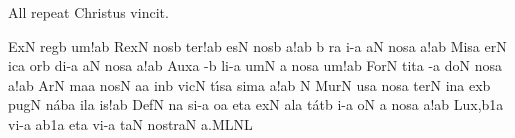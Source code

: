\bigskip

{\itlyrics All repeat \rm Christus vincit.}

\bigskip



\initiumgregorianum
{}%
\sgn {}Ex\punctum N\egn
\spatium
\sgn r{e}g\punctum b\egn
\sgn {}u{m!}\punctum a\augmentum b\egn
\spatium
\divisiofinalis
\spatium
\sgn Rex\punctum N\egn
\spatium
\sgn n{o}s\punctum b\egn
\sgn te{r!}\punctum a\augmentum b\egn
\spatium
\divisiofinalis
\spatium
{}es\punctum N\egn
\spatium
\sgn n{o}s\punctum b\egn
{}a!\punctum a\augmentum b\egn
\spatium
\divisiofinalis
\spatium
\custos b
\lineaproxima
{}r\punctum a\egn
\sgn {}i-\punctum a\egn
\sgn {}a{}\punctum N\egn
\spatium
\sgn n{o}s\punctum a\egn
{}a!\punctum a\augmentum b\egn
\spatium
\divisiofinalis
\spatium
\sgn Mis\punctum a\egn
\sgn {}er\punctum N\egn
\sgn {}ic\punctum a\egn
\sgn {}or\punctum b\egn
\sgn di-\punctum a\egn
\sgn {}a{}\punctum N\egn
\spatium
\sgn n{o}s\punctum a\egn
{}a!\punctum a\augmentum b\egn
\spatium
\divisiofinalis
\spatium
\sgn Aux\punctum a\egn
\sgn {}{\'\i}-\punctum b\egn
\sgn li-\punctum a\egn
\sgn {}um\punctum N\egn
\spatium
\custos a
\lineaproxima
\sgn n{o}s\punctum a\egn
{}u{m!}\punctum a\augmentum b\egn
\spatium
\divisiofinalis
\spatium
\sgn For\punctum N\egn
\sgn tit\punctum a\egn
{}-\punctum a\egn
\sgn do{}\punctum N\egn
\spatium
\sgn n{o}s\punctum a\egn
{}a{!}\punctum a\augmentum b\egn
\spatium
\divisiofinalis
\spatium
\sgn {}Ar\punctum N\egn
\sgn ma{}\punctum a\egn
\spatium
\sgn n{o}s\punctum N\egn
{}a{}\punctum a\egn
\spatium
\sgn {}in\punctum b\egn
\sgn vic\punctum N\egn
\sgn t{\'\i}s\punctum a\egn
\sgn sim\punctum a\egn
\sgn {}a!\punctum a\augmentum b\egn
\spatium
\divisiofinalis
\spatium
\custos N
\lineaproxima
\sgn M{u}r\punctum N\egn
\sgn {}us\punctum a\egn
\spatium
\sgn n{o}s\punctum a\egn
\sgn ter\punctum N\egn
\spatium
\sgn {}in\punctum a\egn
\sgn {}ex\punctum b\egn
\sgn pug\punctum N\egn
\sgn n{\'a}b\punctum a\egn
\sgn {}il\punctum a\egn
\sgn {}i{s!}\punctum a\augmentum b\egn
\spatium
\divisiofinalis
\spatium
\sgn Def\punctum N\egn
{}n\punctum a\egn
\sgn si-\punctum a\egn
\sgn {}o{}\punctum a\egn
\spatium
\sgn {}et\punctum a\egn
\spatium
\sgn {}ex\punctum N\egn
\sgn {}al\punctum a\egn
\sgn t{\'a}t\punctum b\egn
\sgn {}i-\punctum a\egn
\sgn {}o{}\punctum N\egn
\spatium
\custos a
\lineaproxima
\sgn n{o}s\engl{}\punctum a\egn
{}a{!}\punctum a\augmentum b\egn
\spatium
\divisiofinalis
\spatium
\sgn Lu{x,}\omnes\episem b1\punctum a\en
\spatium
\sgn vi-\punctum a\egn
\sgn {}a{}\episem b1\punctum a\en
\spatium
\divisiominima
\spatium
\sgn {}et\punctum a\egn
\spatium
\sgn v{i}-\punctum a\egn
\sgn ta{}\punctum N\egn
\spatium
\sgn n{o}{str}\clivis aN\egn
\sgn {}a.\clivis ML\augmentumduplex NL\egn
\spatium
\Finisgregoriana


